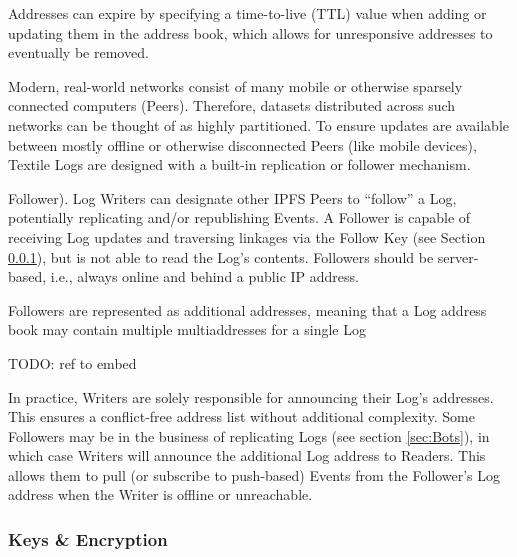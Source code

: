 \documentclass{comjnl}
\begin{document}
Addresses can expire by specifying a time-to-live (TTL) value when adding or updating them in the address book, which allows for unresponsive addresses to eventually be removed.

Modern, real-world networks consist of many mobile or otherwise sparsely connected computers (Peers). Therefore, datasets distributed across such networks can be thought of as highly partitioned. To ensure updates are available between mostly offline or otherwise disconnected Peers (like mobile devices), Textile Logs are designed with a built-in replication or follower mechanism.

\begin{definition}Follower). Log Writers can designate other IPFS Peers to “follow” a Log, potentially replicating and/or republishing Events. A Follower is capable of receiving Log updates and traversing linkages via the Follow Key (see Section  \ref{sec:KeysEncryption}), but is not able to read the Log’s contents. Followers should be server-based, i.e., always online and behind a public IP address.\end{definition}

Followers are represented as additional addresses, meaning that a Log address book may contain multiple multiaddresses for a single Log 

TODO: ref to embed

In practice, Writers are solely responsible for announcing their Log’s addresses. This ensures a conflict-free address list without additional complexity. Some Followers may be in the business of replicating Logs (see section  \ref{sec:Bots}), in which case Writers will announce the additional Log address to Readers. This allows them to pull (or subscribe to push-based) Events from the Follower’s Log address when the Writer is offline or unreachable.

\subsubsection{Keys \& Encryption} \label{sec:KeysEncryption}
\end{document}
